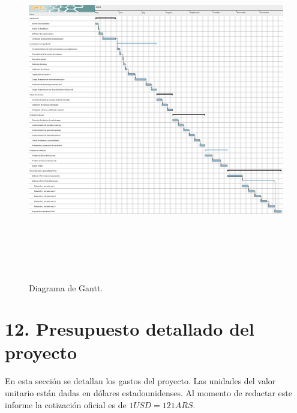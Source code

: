 \documentclass[
11pt, %
]{charter}
\begin{document}
\begin{landscape}
\begin{figure}[htpb]
\centering 
\includegraphics[width=24cm, height=15cm]{./Figuras/gantt.png}
\caption{Diagrama de Gantt.}
\label{fig:gantt}
\end{figure}
\end{landscape}

\section{12. Presupuesto detallado del proyecto}
\label{sec:presupuesto}

En esta sección se detallan los gastos del proyecto. Las unidades del valor unitario están dadas en dólares estadounidenses. Al momento de redactar este informe la cotización oficial es de $1 USD = 121 ARS$.
\end{document}
